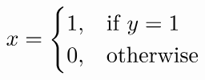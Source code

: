 \documentclass{article}
\begin{document}
    \begin{equation}
    \scalebox{2.0}{$x =
    \begin{cases}
    1, & \text{if } y=1 \\
    0, & \text{otherwise}
    \end{cases}$}
    \end{equation}
    
\end{document}
